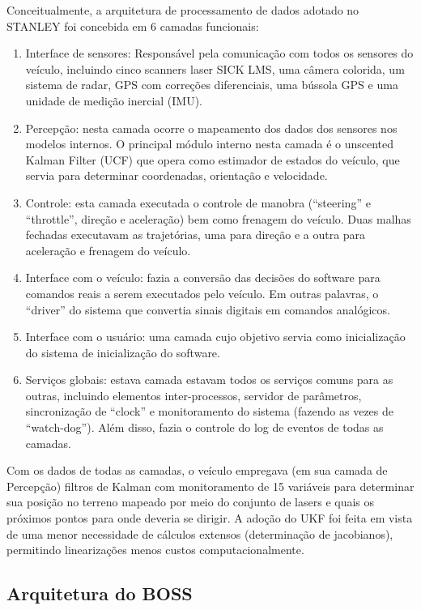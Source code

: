 Conceitualmente, a arquitetura de processamento de dados adotado no STANLEY foi concebida em 6 camadas funcionais:
\begin{enumerate}
    \item Interface de sensores: Responsável pela comunicação com todos os sensores do veículo, incluindo cinco scanners laser SICK LMS, uma câmera colorida, um sistema de radar, GPS com correções diferenciais, uma bússola GPS e uma unidade de medição inercial (IMU).
    \item Percepção: nesta camada ocorre o mapeamento dos dados dos sensores nos modelos internos. O principal módulo interno nesta camada é o unscented Kalman Filter (UCF) que opera como estimador de estados do veículo, que servia para determinar coordenadas, orientação e velocidade.
    \item Controle: esta camada executada o controle de manobra (``steering'' e ``throttle'', direção e aceleração) bem como frenagem do veículo. Duas malhas fechadas executavam as trajetórias, uma para direção e a outra para aceleração e frenagem do veículo.
    \item Interface com o veículo: fazia a conversão das decisões do software para comandos reais a serem executados pelo veículo. Em outras palavras, o ``driver'' do sistema que convertia sinais digitais em comandos analógicos.
    \item Interface com o usuário: uma camada cujo objetivo servia como inicialização do sistema de inicialização do software.
    \item Serviços globais: estava camada estavam todos os serviços comuns para as outras, incluindo elementos inter-processos, servidor de parâmetros, sincronização de ``clock'' e monitoramento do sistema (fazendo as vezes de ``watch-dog''). Além disso, fazia o controle do log de eventos de todas as camadas.
\end{enumerate}

Com os dados de todas as camadas, o veículo empregava (em sua camada de Percepção) filtros de Kalman com monitoramento de 15 variáveis para determinar sua posição no terreno mapeado por meio do conjunto de lasers e quais os próximos pontos para onde deveria se dirigir. A adoção do UKF foi feita em vista de uma menor necessidade de cálculos extensos (determinação de jacobianos), permitindo linearizações menos custos computacionalmente.

\subsection{Arquitetura do BOSS}

